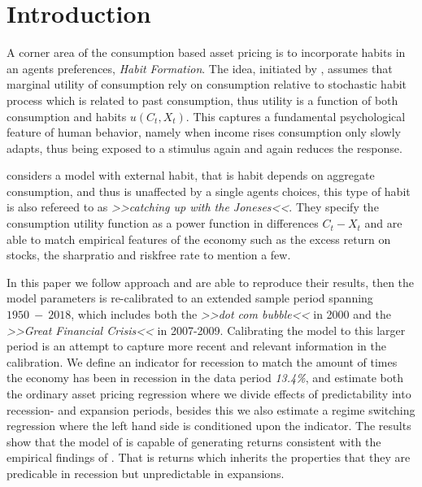 \section{Introduction} \label{sec:Introduction}



A corner area of the consumption based asset pricing is to incorporate habits in an agents preferences, \textit{Habit Formation}. The idea, initiated by \citet{Constantinides_1990}, assumes that marginal utility of consumption rely on consumption relative to stochastic habit process which is related to past consumption, thus utility is a function of both consumption and habits $u \left(C_t, X_t \right)$. This captures a fundamental psychological feature of human behavior, namely when income rises consumption only slowly adapts, thus being exposed to a stimulus again and again reduces the response. 

\citet{Campbell1999} considers a model with external habit, that is habit depends on aggregate consumption, and thus is unaffected by a single agents choices, this type of habit is also refereed to as \textit{>>catching up with the Joneses<<}. They specify the consumption utility function as a power function in differences $C_t - X_t$ and are able to match empirical features of the economy such as the excess return on stocks, the sharpratio and riskfree rate to mention a few. 

In this paper we follow \citet{Campbell1999} approach and are able to reproduce their results, then the model parameters is re-calibrated to an extended sample period spanning  $1950 \ -  \ 2018$, which includes both the \textit{>>dot com bubble<<} in 2000 and the \textit{>>Great Financial Crisis<<} in 2007-2009. Calibrating the model to this larger period is an attempt to capture more recent and relevant information in the calibration. We define an indicator for recession to match the amount of times the economy has been in recession in the data period \textit{13.4\%}, and estimate both the ordinary asset pricing regression where we divide effects of predictability into recession- and expansion periods, besides this we also estimate a regime switching regression where the left hand side is conditioned upon the indicator. 
The results show that the model of \citet{Campbell1999} is capable of generating returns consistent with the empirical findings of \citet{Henkel2011}. That is returns which inherits the properties that they are predicable in recession but unpredictable in expansions.

